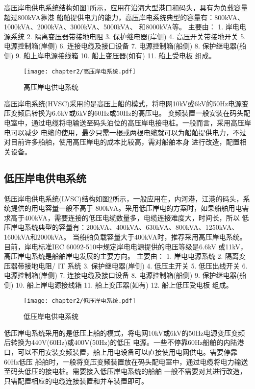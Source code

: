 高压岸电供电系统结构如图\ref{fig:高压岸电供电系统}所示，应用在沿海大型港口和码头，具有为负载容量超过800kVA靠港
船舶提供电力的能力\cite{SP16}，高压岸电系统典型的容量有：800kVA、1000kVA、2000kVA、3000kVA、5000kVA、
和8000kVA等。
主要由：
1. 岸电电源系统
2. 隔离变压器带接地电阻
3. 保护继电器(岸侧)
4. 高压开关带接地开关
5. 电源控制箱(岸侧)
6. 连接电缆及接口设备
7. 电源控制箱(船侧)
8. 保护继电器(船侧)
9. 船上岸电源接线箱
10. 船上变压器(如有)
11. 船上受电板
组成。

\begin{figure}[!htp]
	\centering
	\texttt{[image: chapter2/高压岸电系统.pdf]}
	\caption{高压岸电供电系统}
	\label{fig:高压岸电供电系统}
\end{figure}

高压岸电系统(HVSC)采用的是高压上船的模式，将电网10kV或6kV的50Hz电源变压变频后转换为6.6kV或6kV的60Hz或50Hz的高压电。
变频装置一般安装在码头配电室中，通过电缆将电输送至码头泊位的高压岸电接电桩。一般而言，采用高压岸电可以减少
电缆的使用，最少只需一根或两根电缆就可以为船舶提供电力，不过对目前许多船舶，使用高压岸电的成本比较高，需对船舶本身
进行改造，配置相关设备。

\subsection{低压岸电供电系统}

低压岸电供电系统(LVSC)结构如图\ref{fig:低压岸电供电系统}所示，一般应用在，内河港，江港的码头，系统提供的用电容量一般不高于
800kVA。采用低压岸电的方案时，如果船舶用电需求高于400kVA，需要连接的低压电缆数量多，电缆连接难度大，时间长，所以
低压岸电系统典型的容量有：200kVA、400kVA、630kVA、800kVA、1250kVA、1600kVA和2000kVA。
当船舶负载容量大于400kVA时，推荐采用高压岸电系统。目前，岸电标准IEC 60092-510中规定岸电电源提供的电压等级是6.6kV
或11kV，高压岸电系统是船舶岸电发展的主要方向。 
主要由：
1. 岸电电源系统
2. 隔离变压器带接地电阻/ IT 系统
3. 保护继电器(岸侧)
4. 低压主开关
5. 低压出线开关
6. 电源控制箱(岸侧)
7. 连接电缆及接口设备
8. 电源控制箱(船侧)
9. 保护继电器(船侧)
10. 船上岸电源接线箱
11. 船上变压器(如有)
12. 船上低压受电板
组成。

\begin{figure}[!htp]
	\centering
	\texttt{[image: chapter2/低压岸电系统.pdf]}
	\caption{低压岸电供电系统}
	\label{fig:低压岸电供电系统}
\end{figure}

低压岸电系统采用的是低压上船的模式，将电网10kV或6kV的50Hz电源变压变频后转换为440V(60Hz)或400V(50Hz)的低压
电源。一些不停靠60Hz船舶的内陆港口，可以不用安装变频装置，船上用电设备可以直接使用电网供电。需要停靠60Hz低压
船舶时，一般将变压变频装置放在码头配电室中，通过电缆将电力输送至码头低压的接电桩。需要接入低压岸电系统的船舶
一般不需要对其进行改造，只需配置相应的电缆连接装置和并车装置即可。

